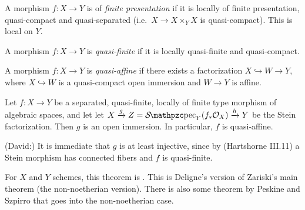 
 \begin{definition}
   A morphism $f:X\to Y$ is of \emph{finite presentation} if it is locally of finite
   presentation, quasi-compact and quasi-separated (i.e.~$X\to X\times_Y X$ is
   quasi-compact). This is local on $Y$. 
 \end{definition}
 \begin{definition}
   A morphism $f:X\to Y$ is \emph{quasi-finite} if it is locally quasi-finite and
   quasi-compact.
 \end{definition}
 \begin{definition}
   A morphism $f:X\to Y$ is \emph{quasi-affine} if there exists a factorization
   $X\hookrightarrow W\to Y$, where $X\hookrightarrow W$ is a quasi-compact open
   immersion and $W\to Y$ is affine.
 \end{definition}
 \begin{theorem}\label{lec17T:stuff->quasi-affine}
   Let $f:X\to Y$ be a separated, quasi-finite, locally of finite type morphism of
   algebraic spaces, and let let $X\xrightarrow g Z=\Spec_Y( f_*\O_X) \xrightarrow h Y$
   be the Stein factorization. Then $g$ is an open immersion. In particular,
   $f$ is quasi-affine.
 \end{theorem}
 
 \begin{remark}
     (David:) It is immediate that $g$ is at least injective, since by
     (Hartshorne III.11) a Stein morphism has connected fibers and $f$
     is quasi-finite.
 \end{remark}
 
 For $X$ and $Y$ schemes, this theorem is \cite[IV.18.12.12]{EGA}. This is Deligne's
 version of Zariski's main theorem (the non-noetherian version). There is also some
 theorem by Peskine and Szpirro that goes into the non-noetherian case.

